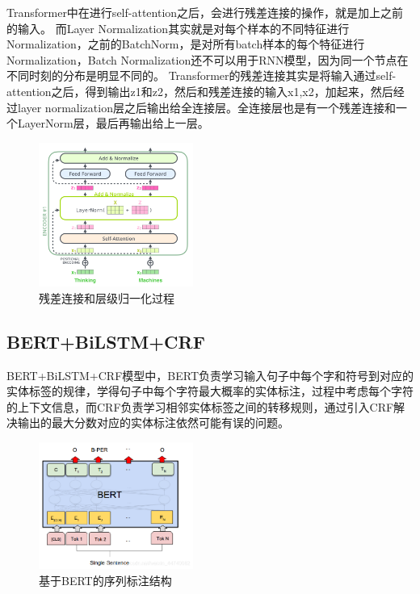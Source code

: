 \documentclass[a4paper, 12pt]{article}
\begin{document}
Transformer中在进行self-attention之后，会进行残差连接的操作，就是加上之前的输入。
而Layer Normalization其实就是对每个样本的不同特征进行Normalization，之前的BatchNorm，是对所有batch样本的每个特征进行Normalization，Batch Normalization还不可以用于RNN模型，因为同一个节点在不同时刻的分布是明显不同的。
Transformer的残差连接其实是将输入通过self-attention之后，得到输出z1和z2，然后和残差连接的输入x1,x2，加起来，然后经过layer normalization层之后输出给全连接层。全连接层也是有一个残差连接和一个LayerNorm层，最后再输出给上一层。

\begin{figure}[htbp]
    \centering
    \includegraphics[width=0.45\textwidth]{layer_norm}
    \caption{残差连接和层级归一化过程}
    \label{fig:encoder}
\end{figure}


\subsection{BERT+BiLSTM+CRF} %
\label{sub:bert}

BERT+BiLSTM+CRF模型中，BERT负责学习输入句子中每个字和符号到对应的实体标签的规律，学得句子中每个字符最大概率的实体标注，过程中考虑每个字符的上下文信息，而CRF负责学习相邻实体标签之间的转移规则，通过引入CRF解决输出的最大分数对应的实体标注依然可能有误的问题。

\begin{figure}[htbp]
    \centering
    \includegraphics[width=0.45\textwidth]{bert}
    \caption{基于BERT的序列标注结构}
    \label{fig:encoder}
\end{figure}
\end{document}
